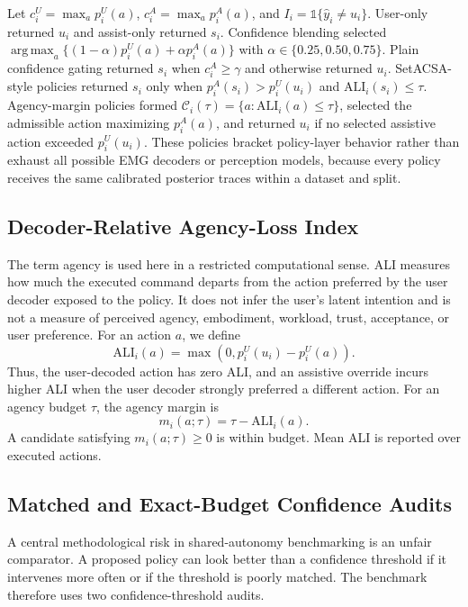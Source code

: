 \documentclass[journal]{IEEEtran}
\newcommand{\ali}{\mathrm{ALI}}
\newcommand{\argmax}{\operatorname*{arg\,max}}
\begin{document}
Let $c_i^U=\max_a p_i^U(a)$, $c_i^A=\max_a p_i^A(a)$, and $I_i=\mathbb{1}\{\hat{y}_i\neq u_i\}$. User-only returned $u_i$ and assist-only returned $s_i$. Confidence blending selected $\argmax_a\{(1-\alpha)p_i^U(a)+\alpha p_i^A(a)\}$ with $\alpha\in\{0.25,0.50,0.75\}$. Plain confidence gating returned $s_i$ when $c_i^A\geq\gamma$ and otherwise returned $u_i$. SetACSA-style policies returned $s_i$ only when $p_i^A(s_i)>p_i^U(u_i)$ and $\ali_i(s_i)\leq\tau$. Agency-margin policies formed $\mathcal{C}_i(\tau)=\{a:\ali_i(a)\leq\tau\}$, selected the admissible action maximizing $p_i^A(a)$, and returned $u_i$ if no selected assistive action exceeded $p_i^U(u_i)$. These policies bracket policy-layer behavior rather than exhaust all possible EMG decoders or perception models, because every policy receives the same calibrated posterior traces within a dataset and split.

\subsection{Decoder-Relative Agency-Loss Index}
The term agency is used here in a restricted computational sense. ALI measures how much the executed command departs from the action preferred by the user decoder exposed to the policy. It does not infer the user's latent intention and is not a measure of perceived agency, embodiment, workload, trust, acceptance, or user preference. For an action $a$, we define
\begin{equation}
    \ali_i(a) = \max\left(0, p_i^U(u_i)-p_i^U(a)\right).
\end{equation}
Thus, the user-decoded action has zero ALI, and an assistive override incurs higher ALI when the user decoder strongly preferred a different action. For an agency budget $\tau$, the agency margin is
\begin{equation}
    m_i(a;\tau) = \tau - \ali_i(a).
\end{equation}
A candidate satisfying $m_i(a;\tau) \geq 0$ is within budget. Mean ALI is reported over executed actions.

\subsection{Matched and Exact-Budget Confidence Audits}
A central methodological risk in shared-autonomy benchmarking is an unfair comparator. A proposed policy can look better than a confidence threshold if it intervenes more often or if the threshold is poorly matched. The benchmark therefore uses two confidence-threshold audits.
\end{document}
